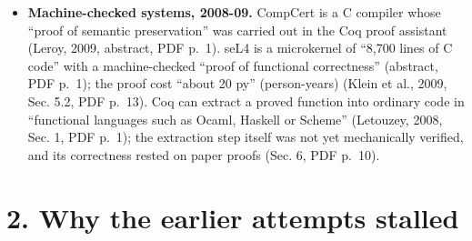 \documentclass[10pt,letterpaper]{article}
\begin{document}
\begin{itemize}
  interviewee reported 4 to 8 times productivity internally while
  telling outsiders ``1.5 to 2'' (Sec. 5.2.6, p.~478). The authors call
  their results ``interesting and suggestive rather than conclusive''
  (Sec. 3.1, p.~473).
\item
  \textbf{Machine-checked systems, 2008-09.} CompCert is a C compiler
  whose ``proof of semantic preservation'' was carried out in the Coq
  proof assistant (Leroy, 2009, abstract, PDF p.~1). seL4 is a
  microkernel of ``8,700 lines of C code'' with a machine-checked
  ``proof of functional correctness'' (abstract, PDF p.~1); the proof
  cost ``about 20 py'' (person-years) (Klein et al., 2009, Sec. 5.2, PDF
  p.~13). Coq can extract a proved function into ordinary code in
  ``functional languages such as Ocaml, Haskell or Scheme'' (Letouzey,
  2008, Sec. 1, PDF p.~1); the extraction step itself was not yet
  mechanically verified, and its correctness rested on paper proofs
  (Sec. 6, PDF p.~10).
\end{itemize}

\section{2. Why the earlier attempts
stalled}\label{why-the-earlier-attempts-stalled}
\end{document}
